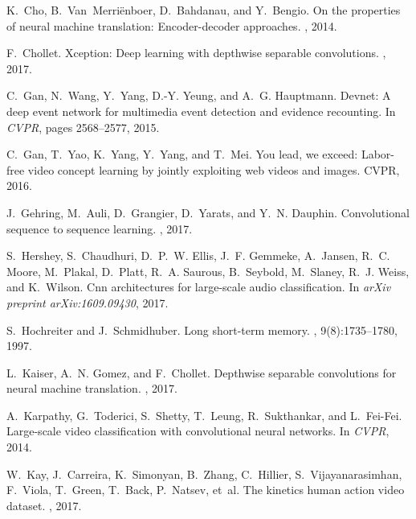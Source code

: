 \documentclass[10pt,twocolumn,letterpaper]{article}
\begin{document}
\begin{thebibliography}{10}\itemsep=-1pt
\small
{}
K.~Cho, B.~Van~Merri{\"e}nboer, D.~Bahdanau, and Y.~Bengio.
\newblock On the properties of neural machine translation: Encoder-decoder
  approaches.
, 2014.

F.~Chollet.
\newblock Xception: Deep learning with depthwise separable convolutions.
, 2017.

C.~Gan, N.~Wang, Y.~Yang, D.-Y. Yeung, and A.~G. Hauptmann.
\newblock Devnet: A deep event network for multimedia event detection and
  evidence recounting.
\newblock In {\em CVPR}, pages 2568--2577, 2015.

C.~Gan, T.~Yao, K.~Yang, Y.~Yang, and T.~Mei.
\newblock You lead, we exceed: Labor-free video concept learning by jointly
  exploiting web videos and images.
\newblock CVPR, 2016.

J.~Gehring, M.~Auli, D.~Grangier, D.~Yarats, and Y.~N. Dauphin.
\newblock Convolutional sequence to sequence learning.
, 2017.

S.~Hershey, S.~Chaudhuri, D.~P.~W. Ellis, J.~F. Gemmeke, A.~Jansen, R.~C.
  Moore, M.~Plakal, D.~Platt, R.~A. Saurous, B.~Seybold, M.~Slaney, R.~J.
  Weiss, and K.~Wilson.
\newblock Cnn architectures for large-scale audio classification.
\newblock In {\em arXiv preprint arXiv:1609.09430}, 2017.

S.~Hochreiter and J.~Schmidhuber.
\newblock Long short-term memory.
, 9(8):1735--1780, 1997.

L.~Kaiser, A.~N. Gomez, and F.~Chollet.
\newblock Depthwise separable convolutions for neural machine translation.
, 2017.

A.~Karpathy, G.~Toderici, S.~Shetty, T.~Leung, R.~Sukthankar, and L.~Fei-Fei.
\newblock Large-scale video classification with convolutional neural networks.
\newblock In {\em CVPR}, 2014.

W.~Kay, J.~Carreira, K.~Simonyan, B.~Zhang, C.~Hillier, S.~Vijayanarasimhan,
  F.~Viola, T.~Green, T.~Back, P.~Natsev, et~al.
\newblock The kinetics human action video dataset.
, 2017.


\end{thebibliography}
\end{document}
